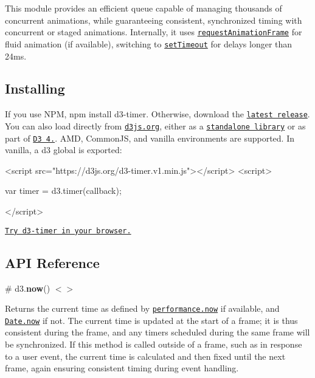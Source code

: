 This module provides an efficient queue capable of managing thousands of concurrent animations, while guaranteeing consistent, synchronized timing with concurrent or staged animations. Internally, it uses \href{https://developer.mozilla.org/en-US/docs/Web/API/window/requestAnimationFrame}{\tt request\+Animation\+Frame} for fluid animation (if available), switching to \href{https://developer.mozilla.org/en-US/docs/Web/API/WindowTimers/setTimeout}{\tt set\+Timeout} for delays longer than 24ms.

\subsection*{Installing}

If you use N\+PM, {\ttfamily npm install d3-\/timer}. Otherwise, download the \href{https://github.com/d3/d3-timer/releases/latest}{\tt latest release}. You can also load directly from \href{https://d3js.org}{\tt d3js.\+org}, either as a \href{https://d3js.org/d3-timer.v1.min.js}{\tt standalone library} or as part of \href{https://github.com/d3/d3}{\tt D3 4.}. A\+MD, Common\+JS, and vanilla environments are supported. In vanilla, a {\ttfamily d3} global is exported\+:


\begin{DoxyCode}
<script src="https://d3js.org/d3-timer.v1.min.js"></script>
<script>

var timer = d3.timer(callback);

</script>
\end{DoxyCode}


\href{https://tonicdev.com/npm/d3-timer}{\tt Try d3-\/timer in your browser.}

\subsection*{A\+PI Reference}

\label{_now}%
\# d3.{\bfseries now}() \href{https://github.com/d3/d3-timer/blob/master/src/timer.js#L15}{\tt $<$$>$}

Returns the current time as defined by \href{https://developer.mozilla.org/en-US/docs/Web/API/Performance/now}{\tt performance.\+now} if available, and \href{https://developer.mozilla.org/en-US/docs/JavaScript/Reference/Global_Objects/Date/now}{\tt Date.\+now} if not. The current time is updated at the start of a frame; it is thus consistent during the frame, and any timers scheduled during the same frame will be synchronized. If this method is called outside of a frame, such as in response to a user event, the current time is calculated and then fixed until the next frame, again ensuring consistent timing during event handling.

